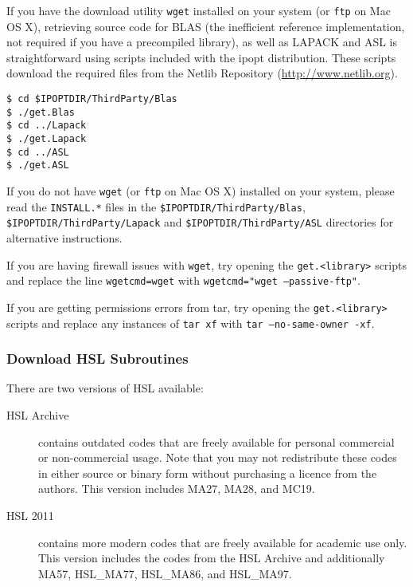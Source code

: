 \documentclass[10pt]{article}
\begin{document}
If you have the download utility \texttt{wget} installed on your
system (or \texttt{ftp} on Mac OS X), retrieving source code for
BLAS (the inefficient reference
implementation, not required if you have a precompiled library), as
well as LAPACK and ASL is straightforward using scripts included with
the ipopt distribution.  These scripts download the required files
from the Netlib Repository
(\url{http://www.netlib.org}).
\medskip

\noindent
{\tt \$ cd \$IPOPTDIR/ThirdParty/Blas}\\
{\tt \$ ./get.Blas}\\
{\tt \$ cd ../Lapack}\\
{\tt \$ ./get.Lapack}\\
{\tt \$ cd ../ASL}\\
{\tt \$ ./get.ASL}
\medskip

\noindent
If you do not have \texttt{wget} (or \texttt{ftp} on Mac OS X) installed
on your system, please read the \texttt{INSTALL.*} files in the
\texttt{\$IPOPTDIR/ThirdParty/Blas},
\texttt{\$IPOPTDIR/ThirdParty/Lapack} and
\texttt{\$IPOPTDIR/ThirdParty/ASL} directories for alternative
instructions.

If you are having firewall issues with {\tt wget}, try opening the {\tt get.<library>} scripts and replace the line {\tt wgetcmd=wget} with {\tt wgetcmd="wget --passive-ftp"}.

If you are getting permissions errors from tar, try opening the {\tt get.<library>} scripts and replace any instances of {\tt tar xf} with {\tt tar --no-same-owner -xf}.

\subsubsection{Download HSL Subroutines}
\label{sec:HSL}

\noindent
There are two versions of HSL available:
\begin{description}
\item[HSL Archive] contains outdated codes that are freely available for
personal commercial or non-com\-mer\-cial usage. Note that you may not
redistribute these codes in either source or binary form without purchasing a
licence from the authors. This version includes MA27, MA28, and MC19.
\item[HSL 2011] contains more modern codes that are freely available for
academic use only. This version includes the codes from the HSL Archive and 
additionally MA57, HSL\_MA77, HSL\_MA86, and HSL\_MA97.
\end{description}
\end{document}
